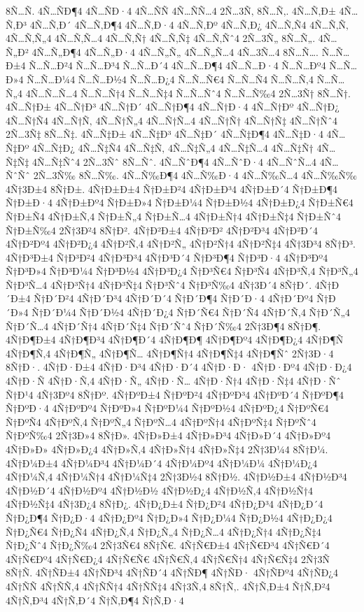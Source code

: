 {8Ñ…Ñ.
4Ñ…ÑÐ¶4
4Ñ…ÑÐ·4
4Ñ…ÑÑ
4Ñ…ÑÑ…4
2Ñ…3Ñ‚
8Ñ…Ñ‚.
4Ñ…Ñ‚Ð±
4Ñ…Ñ‚Ð³
4Ñ…Ñ‚Ð´
4Ñ…Ñ‚Ð¶4
4Ñ…Ñ‚Ð·4
4Ñ…Ñ‚Ðº
4Ñ…Ñ‚Ð¿
4Ñ…Ñ‚Ñ4
4Ñ…Ñ‚Ñ‚
4Ñ…Ñ‚Ñ„4
4Ñ…Ñ‚Ñ…4
4Ñ…Ñ‚Ñ†
4Ñ…Ñ‚Ñ‡
4Ñ…Ñ‚Ñˆ4
2Ñ…3Ñ„
8Ñ…Ñ„.
4Ñ…Ñ„Ð²
4Ñ…Ñ„Ð¶4
4Ñ…Ñ„Ð·4
4Ñ…Ñ„Ñ„
4Ñ…Ñ„Ñ…4
4Ñ…3Ñ…4
8Ñ…Ñ….
Ñ…Ñ…Ð±4
Ñ…Ñ…Ð²4
Ñ…Ñ…Ð³4
Ñ…Ñ…Ð´4
4Ñ…Ñ…Ð¶4
4Ñ…Ñ…Ð·4
Ñ…Ñ…Ðº4
Ñ…Ñ…Ð»4
Ñ…Ñ…Ð¼4
Ñ…Ñ…Ð½4
Ñ…Ñ…Ð¿4
Ñ…Ñ…Ñ€4
Ñ…Ñ…Ñ4
Ñ…Ñ…Ñ‚4
Ñ…Ñ…Ñ„4
4Ñ…Ñ…Ñ…4
Ñ…Ñ…Ñ†4
Ñ…Ñ…Ñ‡4
Ñ…Ñ…Ñˆ4
Ñ…Ñ…Ñ‰4
2Ñ…3Ñ†
8Ñ…Ñ†.
4Ñ…Ñ†Ð±
4Ñ…Ñ†Ð³
4Ñ…Ñ†Ð´
4Ñ…Ñ†Ð¶4
4Ñ…Ñ†Ð·4
4Ñ…Ñ†Ðº
4Ñ…Ñ†Ð¿
4Ñ…Ñ†Ñ4
4Ñ…Ñ†Ñ‚
4Ñ…Ñ†Ñ„4
4Ñ…Ñ†Ñ…4
4Ñ…Ñ†Ñ†
4Ñ…Ñ†Ñ‡
4Ñ…Ñ†Ñˆ4
2Ñ…3Ñ‡
8Ñ…Ñ‡.
4Ñ…Ñ‡Ð±
4Ñ…Ñ‡Ð³
4Ñ…Ñ‡Ð´
4Ñ…Ñ‡Ð¶4
4Ñ…Ñ‡Ð·4
4Ñ…Ñ‡Ðº
4Ñ…Ñ‡Ð¿
4Ñ…Ñ‡Ñ4
4Ñ…Ñ‡Ñ‚
4Ñ…Ñ‡Ñ„4
4Ñ…Ñ‡Ñ…4
4Ñ…Ñ‡Ñ†
4Ñ…Ñ‡Ñ‡
4Ñ…Ñ‡Ñˆ4
2Ñ…3Ñˆ
8Ñ…Ñˆ.
4Ñ…ÑˆÐ¶4
4Ñ…ÑˆÐ·4
4Ñ…ÑˆÑ…4
4Ñ…ÑˆÑˆ
2Ñ…3Ñ‰
8Ñ…Ñ‰.
4Ñ…Ñ‰Ð¶4
4Ñ…Ñ‰Ð·4
4Ñ…Ñ‰Ñ…4
4Ñ…Ñ‰Ñ‰
4Ñ†3Ð±4
8Ñ†Ð±.
4Ñ†Ð±Ð±4
Ñ†Ð±Ð²4
4Ñ†Ð±Ð³4
4Ñ†Ð±Ð´4
Ñ†Ð±Ð¶4
Ñ†Ð±Ð·4
4Ñ†Ð±Ðº4
Ñ†Ð±Ð»4
Ñ†Ð±Ð¼4
Ñ†Ð±Ð½4
4Ñ†Ð±Ð¿4
Ñ†Ð±Ñ€4
Ñ†Ð±Ñ4
4Ñ†Ð±Ñ‚4
Ñ†Ð±Ñ„4
Ñ†Ð±Ñ…4
4Ñ†Ð±Ñ†4
4Ñ†Ð±Ñ‡4
Ñ†Ð±Ñˆ4
Ñ†Ð±Ñ‰4
2Ñ†3Ð²4
8Ñ†Ð².
4Ñ†Ð²Ð±4
4Ñ†Ð²Ð²
4Ñ†Ð²Ð³4
4Ñ†Ð²Ð´4
4Ñ†Ð²Ðº4
4Ñ†Ð²Ð¿4
4Ñ†Ð²Ñ‚4
4Ñ†Ð²Ñ„
4Ñ†Ð²Ñ†4
4Ñ†Ð²Ñ‡4
4Ñ†3Ð³4
8Ñ†Ð³.
4Ñ†Ð³Ð±4
Ñ†Ð³Ð²4
4Ñ†Ð³Ð³4
4Ñ†Ð³Ð´4
Ñ†Ð³Ð¶4
Ñ†Ð³Ð·4
4Ñ†Ð³Ðº4
Ñ†Ð³Ð»4
Ñ†Ð³Ð¼4
Ñ†Ð³Ð½4
4Ñ†Ð³Ð¿4
Ñ†Ð³Ñ€4
Ñ†Ð³Ñ4
4Ñ†Ð³Ñ‚4
Ñ†Ð³Ñ„4
Ñ†Ð³Ñ…4
4Ñ†Ð³Ñ†4
4Ñ†Ð³Ñ‡4
Ñ†Ð³Ñˆ4
Ñ†Ð³Ñ‰4
4Ñ†3Ð´4
8Ñ†Ð´.
4Ñ†Ð´Ð±4
Ñ†Ð´Ð²4
4Ñ†Ð´Ð³4
4Ñ†Ð´Ð´4
Ñ†Ð´Ð¶4
Ñ†Ð´Ð·4
4Ñ†Ð´Ðº4
Ñ†Ð´Ð»4
Ñ†Ð´Ð¼4
Ñ†Ð´Ð½4
4Ñ†Ð´Ð¿4
Ñ†Ð´Ñ€4
Ñ†Ð´Ñ4
4Ñ†Ð´Ñ‚4
Ñ†Ð´Ñ„4
Ñ†Ð´Ñ…4
4Ñ†Ð´Ñ†4
4Ñ†Ð´Ñ‡4
Ñ†Ð´Ñˆ4
Ñ†Ð´Ñ‰4
2Ñ†3Ð¶4
8Ñ†Ð¶.
4Ñ†Ð¶Ð±4
4Ñ†Ð¶Ð³4
4Ñ†Ð¶Ð´4
4Ñ†Ð¶Ð¶
4Ñ†Ð¶Ðº4
4Ñ†Ð¶Ð¿4
4Ñ†Ð¶Ñ
4Ñ†Ð¶Ñ‚4
4Ñ†Ð¶Ñ„
4Ñ†Ð¶Ñ…
4Ñ†Ð¶Ñ†4
4Ñ†Ð¶Ñ‡4
4Ñ†Ð¶Ñˆ
2Ñ†3Ð·4
8Ñ†Ð·.
4Ñ†Ð·Ð±4
4Ñ†Ð·Ð³4
4Ñ†Ð·Ð´4
4Ñ†Ð·Ð·
4Ñ†Ð·Ðº4
4Ñ†Ð·Ð¿4
4Ñ†Ð·Ñ
4Ñ†Ð·Ñ‚4
4Ñ†Ð·Ñ„
4Ñ†Ð·Ñ…
4Ñ†Ð·Ñ†4
4Ñ†Ð·Ñ‡4
4Ñ†Ð·Ñˆ
Ñ†Ð¹4
4Ñ†3Ðº4
8Ñ†Ðº.
4Ñ†ÐºÐ±4
Ñ†ÐºÐ²4
4Ñ†ÐºÐ³4
4Ñ†ÐºÐ´4
Ñ†ÐºÐ¶4
Ñ†ÐºÐ·4
4Ñ†ÐºÐº4
Ñ†ÐºÐ»4
Ñ†ÐºÐ¼4
Ñ†ÐºÐ½4
4Ñ†ÐºÐ¿4
Ñ†ÐºÑ€4
Ñ†ÐºÑ4
4Ñ†ÐºÑ‚4
Ñ†ÐºÑ„4
Ñ†ÐºÑ…4
4Ñ†ÐºÑ†4
4Ñ†ÐºÑ‡4
Ñ†ÐºÑˆ4
Ñ†ÐºÑ‰4
2Ñ†3Ð»4
8Ñ†Ð».
4Ñ†Ð»Ð±4
4Ñ†Ð»Ð³4
4Ñ†Ð»Ð´4
4Ñ†Ð»Ðº4
4Ñ†Ð»Ð»
4Ñ†Ð»Ð¿4
4Ñ†Ð»Ñ‚4
4Ñ†Ð»Ñ†4
4Ñ†Ð»Ñ‡4
2Ñ†3Ð¼4
8Ñ†Ð¼.
4Ñ†Ð¼Ð±4
4Ñ†Ð¼Ð³4
4Ñ†Ð¼Ð´4
4Ñ†Ð¼Ðº4
4Ñ†Ð¼Ð¼
4Ñ†Ð¼Ð¿4
4Ñ†Ð¼Ñ‚4
4Ñ†Ð¼Ñ†4
4Ñ†Ð¼Ñ‡4
2Ñ†3Ð½4
8Ñ†Ð½.
4Ñ†Ð½Ð±4
4Ñ†Ð½Ð³4
4Ñ†Ð½Ð´4
4Ñ†Ð½Ðº4
4Ñ†Ð½Ð½
4Ñ†Ð½Ð¿4
4Ñ†Ð½Ñ‚4
4Ñ†Ð½Ñ†4
4Ñ†Ð½Ñ‡4
4Ñ†3Ð¿4
8Ñ†Ð¿.
4Ñ†Ð¿Ð±4
Ñ†Ð¿Ð²4
4Ñ†Ð¿Ð³4
4Ñ†Ð¿Ð´4
Ñ†Ð¿Ð¶4
Ñ†Ð¿Ð·4
4Ñ†Ð¿Ðº4
Ñ†Ð¿Ð»4
Ñ†Ð¿Ð¼4
Ñ†Ð¿Ð½4
4Ñ†Ð¿Ð¿4
Ñ†Ð¿Ñ€4
Ñ†Ð¿Ñ4
4Ñ†Ð¿Ñ‚4
Ñ†Ð¿Ñ„4
Ñ†Ð¿Ñ…4
4Ñ†Ð¿Ñ†4
4Ñ†Ð¿Ñ‡4
Ñ†Ð¿Ñˆ4
Ñ†Ð¿Ñ‰4
2Ñ†3Ñ€4
8Ñ†Ñ€.
4Ñ†Ñ€Ð±4
4Ñ†Ñ€Ð³4
4Ñ†Ñ€Ð´4
4Ñ†Ñ€Ðº4
4Ñ†Ñ€Ð¿4
4Ñ†Ñ€Ñ€
4Ñ†Ñ€Ñ‚4
4Ñ†Ñ€Ñ†4
4Ñ†Ñ€Ñ‡4
2Ñ†3Ñ
8Ñ†Ñ.
4Ñ†ÑÐ±4
4Ñ†ÑÐ³4
4Ñ†ÑÐ´4
4Ñ†ÑÐ¶
4Ñ†ÑÐ·
4Ñ†ÑÐº4
4Ñ†ÑÐ¿4
4Ñ†ÑÑ
4Ñ†ÑÑ‚4
4Ñ†ÑÑ†4
4Ñ†ÑÑ‡4
4Ñ†3Ñ‚4
8Ñ†Ñ‚.
4Ñ†Ñ‚Ð±4
Ñ†Ñ‚Ð²4
4Ñ†Ñ‚Ð³4
4Ñ†Ñ‚Ð´4
Ñ†Ñ‚Ð¶4
Ñ†Ñ‚Ð·4
}
